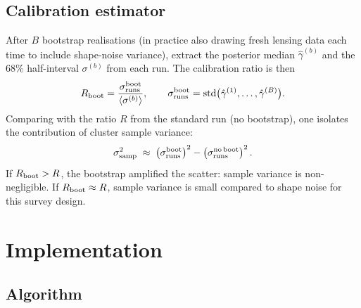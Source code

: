 \documentclass[11pt,a4paper]{article}
\begin{document}
\subsection{Calibration estimator}

After $B$ bootstrap realisations (in practice also drawing fresh lensing
data each time to include shape-noise variance), extract the posterior median
$\hat\gamma^{(b)}$ and the 68\% half-interval $\sigma^{(b)}$ from each run.
The calibration ratio is then
\begin{equation}
  R_{\rm boot}
  = \frac{\sigma_{\rm runs}^{\rm boot}}{\langle\sigma^{(b)}\rangle},
  \qquad
  \sigma_{\rm runs}^{\rm boot}
  = \mathrm{std}\bigl(\hat\gamma^{(1)},\ldots,\hat\gamma^{(B)}\bigr).
\end{equation}
Comparing with the ratio $R$ from the standard run (no bootstrap), one
isolates the contribution of cluster sample variance:
\begin{equation}
  \sigma_{\rm samp}^2
  \;\approx\;
  \left(\sigma_{\rm runs}^{\rm boot}\right)^2
  - \left(\sigma_{\rm runs}^{\rm no\,boot}\right)^2.
\end{equation}
If $R_{\rm boot} > R$, the bootstrap amplified the scatter: sample variance
is non-negligible.  If $R_{\rm boot} \approx R$, sample variance is small
compared to shape noise for this survey design.

\section{Implementation}

\subsection{Algorithm}
\end{document}
